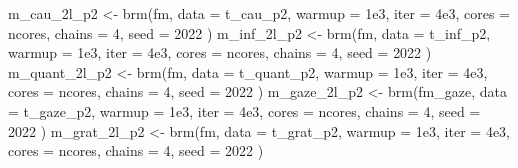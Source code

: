 \documentclass[
]{article}
\newenvironment{Shaded}{\begin{snugshade}}{\end{snugshade}}
\newcommand{\AttributeTok}[1]{\textcolor[rgb]{0.77,0.63,0.00}{#1}}
\newcommand{\DecValTok}[1]{\textcolor[rgb]{0.00,0.00,0.81}{#1}}
\newcommand{\FloatTok}[1]{\textcolor[rgb]{0.00,0.00,0.81}{#1}}
\newcommand{\FunctionTok}[1]{\textcolor[rgb]{0.00,0.00,0.00}{#1}}
\newcommand{\NormalTok}[1]{#1}
\newcommand{\OtherTok}[1]{\textcolor[rgb]{0.56,0.35,0.01}{#1}}
\begin{document}
\begin{Shaded}
\begin{Highlighting}[]
\NormalTok{m\_cau\_2l\_p2 }\OtherTok{\textless{}{-}} \FunctionTok{brm}\NormalTok{(fm, }\AttributeTok{data =}\NormalTok{ t\_cau\_p2, }
                   \AttributeTok{warmup =} \FloatTok{1e3}\NormalTok{, }\AttributeTok{iter =} \FloatTok{4e3}\NormalTok{, }\AttributeTok{cores =}\NormalTok{ ncores, }\AttributeTok{chains =} \DecValTok{4}\NormalTok{, }
                   \AttributeTok{seed =} \DecValTok{2022}
\NormalTok{                   )}
\NormalTok{m\_inf\_2l\_p2 }\OtherTok{\textless{}{-}} \FunctionTok{brm}\NormalTok{(fm, }\AttributeTok{data =}\NormalTok{ t\_inf\_p2, }
                   \AttributeTok{warmup =} \FloatTok{1e3}\NormalTok{, }\AttributeTok{iter =} \FloatTok{4e3}\NormalTok{, }\AttributeTok{cores =}\NormalTok{ ncores, }\AttributeTok{chains =} \DecValTok{4}\NormalTok{, }
                   \AttributeTok{seed =} \DecValTok{2022}
\NormalTok{                   )}
\NormalTok{m\_quant\_2l\_p2 }\OtherTok{\textless{}{-}} \FunctionTok{brm}\NormalTok{(fm, }\AttributeTok{data =}\NormalTok{ t\_quant\_p2, }
                     \AttributeTok{warmup =} \FloatTok{1e3}\NormalTok{, }\AttributeTok{iter =} \FloatTok{4e3}\NormalTok{, }\AttributeTok{cores =}\NormalTok{ ncores, }\AttributeTok{chains =} \DecValTok{4}\NormalTok{, }
                     \AttributeTok{seed =} \DecValTok{2022}
\NormalTok{                     )}
\NormalTok{m\_gaze\_2l\_p2 }\OtherTok{\textless{}{-}} \FunctionTok{brm}\NormalTok{(fm\_gaze, }\AttributeTok{data =}\NormalTok{ t\_gaze\_p2, }
                    \AttributeTok{warmup =} \FloatTok{1e3}\NormalTok{, }\AttributeTok{iter =} \FloatTok{4e3}\NormalTok{, }\AttributeTok{cores =}\NormalTok{ ncores, }\AttributeTok{chains =} \DecValTok{4}\NormalTok{, }
                    \AttributeTok{seed =} \DecValTok{2022}
\NormalTok{                    )}
\NormalTok{m\_grat\_2l\_p2 }\OtherTok{\textless{}{-}} \FunctionTok{brm}\NormalTok{(fm, }\AttributeTok{data =}\NormalTok{ t\_grat\_p2,}
                    \AttributeTok{warmup =} \FloatTok{1e3}\NormalTok{, }\AttributeTok{iter =} \FloatTok{4e3}\NormalTok{, }\AttributeTok{cores =}\NormalTok{ ncores, }\AttributeTok{chains =} \DecValTok{4}\NormalTok{, }
                    \AttributeTok{seed =} \DecValTok{2022}
\NormalTok{                    )}
\end{Highlighting}
\end{Shaded}
\end{document}
